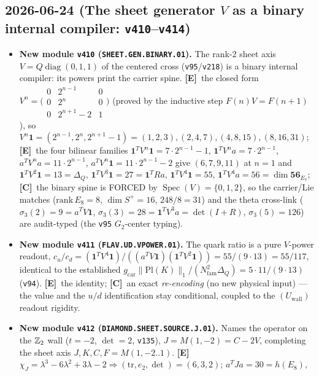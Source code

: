 \documentclass[11pt]{article}
\providecommand{\mE}{\textbf{[E]}}\providecommand{\mC}{\textbf{[C]}}
\providecommand{\vref}[1]{\texttt{#1}}
\providecommand{\gcar}{g_{\mathrm{car}}}\providecommand{\Nfam}{N_{\mathrm{fam}}}
\begin{document}
\subsection*{2026-06-24 (The sheet generator $V$ as a binary internal compiler: \texttt{v410}--\texttt{v414})}
\begin{itemize}
\item \textbf{New module \texttt{v410} (\texttt{SHEET.GEN.BINARY.01}).} The rank-$2$ sheet axis
$V=Q\operatorname{diag}(0,1,1)$ of the centered cross (\vref{v95}/\vref{v218}) is a binary internal compiler:
its powers print the carrier spine. \mE\ the closed form $V^n=\big(\begin{smallmatrix}0&2^{n-1}&0\\0&2^n&0\\0&2^{n+1}-2&1\end{smallmatrix}\big)$
(proved by the inductive step $F(n)V{=}F(n{+}1)$), so $V^n\mathbf 1=(2^{n-1},2^n,2^{n+1}-1)=(1,2,3),(2,4,7),(4,8,15),(8,16,31)$;
\mE\ the four bilinear families $\mathbf 1^TV^n\mathbf 1=7\cdot2^{n-1}{-}1$, $\mathbf 1^TV^na=7\cdot2^{n-1}$,
$a^TV^na=11\cdot2^{n-1}$, $a^TV^n\mathbf 1=11\cdot2^{n-1}{-}2$ give $(6,7,9,11)$ at $n{=}1$ and
$\mathbf 1^TV^2\mathbf 1{=}13{=}\Delta_Q$, $\mathbf 1^TV^3\mathbf 1{=}27{=}\mathbf 1^TRa$,
$\mathbf 1^TV^4\mathbf 1{=}55$, $\mathbf 1^TV^4a{=}56{=}\dim\mathbf{56}_{E_7}$; \mC\ the binary spine is FORCED by
$\operatorname{Spec}(V){=}\{0,1,2\}$, so the carrier/Lie matches ($\mathrm{rank}\,E_8{=}8$, $\dim S^+{=}16$,
$248/8{=}31$) and the theta cross-link ($\sigma_3(2){=}9{=}a^TV\mathbf 1$, $\sigma_3(3){=}28{=}\mathbf 1^TV^3a{=}\det(I{+}R)$,
$\sigma_3(5){=}126$) are audit-typed (the \vref{v95} $G_2$-center typing).
\item \textbf{New module \texttt{v411} (\texttt{FLAV.UD.VPOWER.01}).} The quark ratio is a pure $V$-power readout,
$c_u/c_d=(\mathbf 1^TV^4\mathbf 1)/((a^TV\mathbf 1)(\mathbf 1^TV^2\mathbf 1))=55/(9\cdot13)=55/117$, identical to the
established $\gcar\|\mathrm{Pl}(K)\|_1/(\Nfam^2\Delta_Q)=5\cdot11/(9\cdot13)$ (\vref{v94}). \mE\ the identity; \mC\ an
exact \emph{re-encoding} (no new physical input) --- the value and the $u/d$ identification stay conditional, coupled
to the $(U_{\mathrm{wall}})$ readout rigidity.
\item \textbf{New module \texttt{v412} (\texttt{DIAMOND.SHEET.SOURCE.J.01}).} Names the operator on the $\mathbb{Z}_2$ wall
($t{=}{-}2$, $\det{=}2$, \vref{v135}), $J{=}M(1,{-}2){=}C{-}2V$, completing the sheet axis $J,K,C,F{=}M(1,{-}2..1)$.
\mE\ $\chi_J=\lambda^3-6\lambda^2+3\lambda-2\Rightarrow(\mathrm{tr},e_2,\det){=}(6,3,2)$; $a^TJa{=}30{=}h(E_8)$,

\end{itemize}
\end{document}
